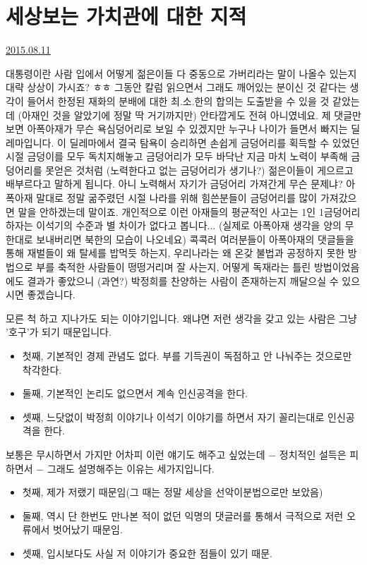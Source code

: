 
\section{세상보는 가치관에 대한 지적}
\href{https://www.kockoc.com/Apoc/243417}{2015.08.11}

\vspace{5mm}

대통령이란 사람 입에서 어떻게 젊은이들 다 중동으로 가버리라는 말이 나올수 있는지 대략 상상이 가시죠? ㅎㅎ
그동안 칼럼 읽으면서 그래도 깨어있는 분이신 것 같다는 생각이 들어서 한정된 재화의 분배에 대한 최.소.한의 합의는 도출받을 수 있을 것 같았는데 (아재인 것을 알았기에 정말 딱 거기까지만) 안타깝게도 전혀 아니였네요.
제 댓글만 보면 아폭아재가 무슨 욕심덩어리로 보일 수 있겠지만 누구나 나이가 들면서 빠지는 딜레마입니다. 이 딜레마에서 결국 탐욕이 승리하면 손쉽게 금덩어리를 획득할 수 있었던 시절 금덩이를 모두 독치지해놓고 금덩어리가 모두 바닥난 지금 마치 노력이 부족해 금덩어리를 못얻은 것처럼 (노력한다고 없는 금덩어리가 생기나?) 젊은이들이 게으르고 배부르다고 말하게 됩니다. 아니 노력해서 자기가 금덩어리 가져간게 무슨 문제냐? 아폭아재 말대로 정말 굶주렸던 시절 나라를 위해 힘쓴분들이 금덩어리를 많이 가져갔으면 말을 안하겠는데 말이죠.
개인적으로 이런 아재들의 평균적인 사고는 1인 1금덩어리 하자는 이석기의 수준과 별 차이가 없다고 봅니다... (실제로 아폭아재 생각을 양의 무한대로 보내버리면 북한의 모습이 나오네요)
콕콕러 여러분들이 아폭아재의 댓글들을 통해 재벌들이 왜 탈세를 밥먹듯 하는지, 우리나라는 왜 온갖 불법과 공정하지 못한 방법으로 부를 축적한 사람들이 떵떵거리며 잘 사는지, 어떻게 독재라는 틀린 방법이었음에도 결과가 좋았으니 (과연?) 박정희를 찬양하는 사람이 존재하는지 깨달으실 수 있으시면 좋겠습니다.
\vspace{5mm}

모른 척 하고 지나가도 되는 이야기입니다. 왜냐면 저런 생각을 갖고 있는 사람은 그냥 '호구'가 되기 때문입니다.
\begin{itemize}
    \item  첫째, 기본적인 경제 관념도 없다. 부를 기득권이 독점하고 안 나눠주는 것으로만 착각한다.
    \item 둘째, 기본적인 논리도 없으면서 계속 인신공격을 한다.
    \item 셋째, 느닷없이 박정희 이야기나 이석기 이야기를 하면서 자기 꼴리는대로 인신공격을 한다.
\end{itemize}
\vspace{5mm}

보통은 무시하면서 가지만 어차피 이런 얘기도 해주고 싶었는데 $-$ 정치적인 설득은 피하면서 $-$ 그래도 설명해주는 이유는 세가지입니다.
\vspace{5mm}
\begin{itemize}
    \item 첫째, 제가 저랬기 때문임(그 때는 정말 세상을 선악이분법으로만 보았음)
    \item 둘째, 역시 단 한번도 만나본 적이 없던 익명의 댓글러를 통해서 극적으로 저런 오류에서 벗어났기 때문임.
    \item 셋째, 입시보다도 사실 저 이야기가 중요한 점들이 있기 때문.
\end{itemize}
\vspace{5mm}

